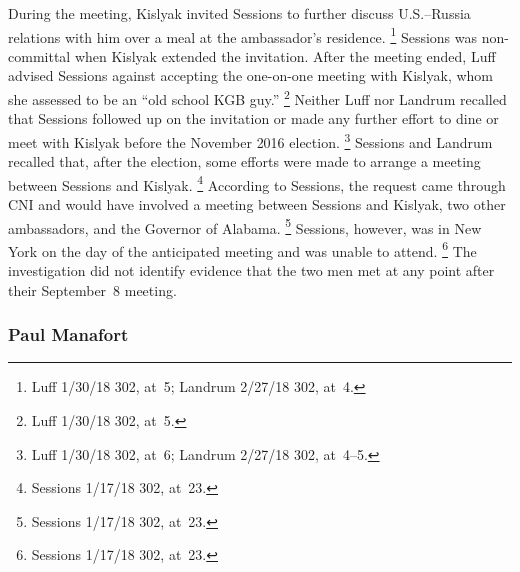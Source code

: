 During the meeting, Kislyak invited Sessions to further discuss U.S.--Russia relations with him over a meal at the ambassador's residence.%
\footnote{Luff 1/30/18 302, at~5;
Landrum 2/27/18 302, at~4.}
Sessions was non-committal when Kislyak extended the invitation.
After the meeting ended, Luff advised Sessions against accepting the one-on-one meeting with Kislyak, whom she assessed to be an ``old school KGB guy.''%
\footnote{Luff 1/30/18 302, at~5.}
Neither Luff nor Landrum recalled that Sessions followed up on the invitation or made any further effort to dine or meet with Kislyak before the November 2016 election.%
\footnote{Luff 1/30/18 302, at~6;
Landrum 2/27/18 302, at~4--5.}
Sessions and Landrum recalled that, after the election, some efforts were made to arrange a meeting between Sessions and Kislyak.%
\footnote{Sessions 1/17/18 302, at~23.}
According to Sessions, the request came through CNI and would have involved a meeting between Sessions and Kislyak, two other ambassadors, and the Governor of Alabama.%
\footnote{Sessions 1/17/18 302, at~23.}
Sessions, however, was in New York on the day of the anticipated meeting and was unable to attend.%
\footnote{Sessions 1/17/18 302, at~23.}
The investigation did not identify evidence that the two men met at any point after their September~8 meeting.

\subsubsection{Paul Manafort}

